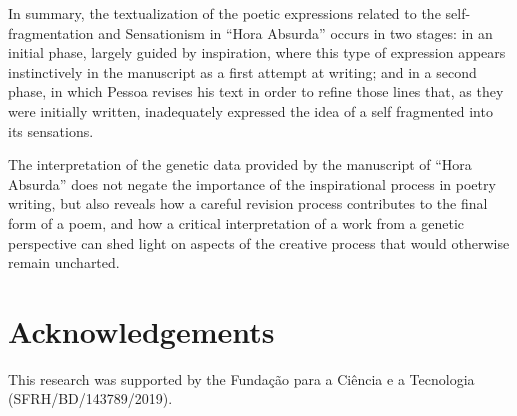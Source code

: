 \documentclass{article}
\begin{document}
In summary, the textualization of the poetic expressions related to the
self-fragmentation and Sensationism in ``Hora Absurda'' occurs in two
stages: in an initial phase, largely guided by inspiration, where this
type of expression appears instinctively in the manuscript as a first
attempt at writing; and in a second phase, in which Pessoa revises his
text in order to refine those lines that, as they were initially
written, inadequately expressed the idea of a self fragmented
into its sensations.

The interpretation of the genetic data provided by the manuscript of
``Hora Absurda'' does not negate the importance of the inspirational
process in poetry writing, but also reveals how a careful revision
process contributes to the final form of a poem, and how a critical
interpretation of a work from a genetic perspective can shed light on
aspects of the creative process that would otherwise remain uncharted.

\section*{Acknowledgements}
This research was supported by the Fundação para a Ciência e a Tecnologia (SFRH/BD/143789/2019).

\begin{flushleft}
    \renewcommand*{\mkbibnamefamily}[1]{\textsc{#1}}
    \renewcommand*{\mkbibnamegiven}[1]{\textsc{#1}} 
\printbibliography
\end{flushleft}
\end{document}
